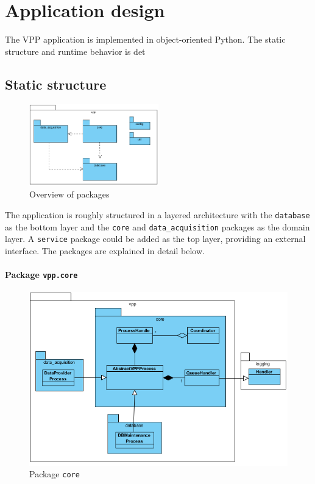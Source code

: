 \newpage
\chapter{Application design} \label{ch:sw_design}
The VPP application is implemented in object-oriented Python. The static structure and runtime behavior is det

\section{Static structure}

\begin{figure}[H]
    \centering
    \includegraphics[width=0.5\textwidth]{figures/class_overview}
    \caption{Overview of packages}
    \label{figureClassDiagram}
\end{figure}

The application is roughly structured in a layered architecture with the \texttt{database} as the bottom layer and the \texttt{core} and \texttt{data\_acquisition} packages as the domain layer. A \texttt{service} package could be added as the top layer, providing an external interface. The packages are explained in detail below.


\subsubsection{Package \texttt{vpp.core}}

\begin{figure}[H]
    \centering
    \includegraphics[width=\textwidth]{figures/class_core}
    \caption{Package \texttt{core}}
\end{figure}


